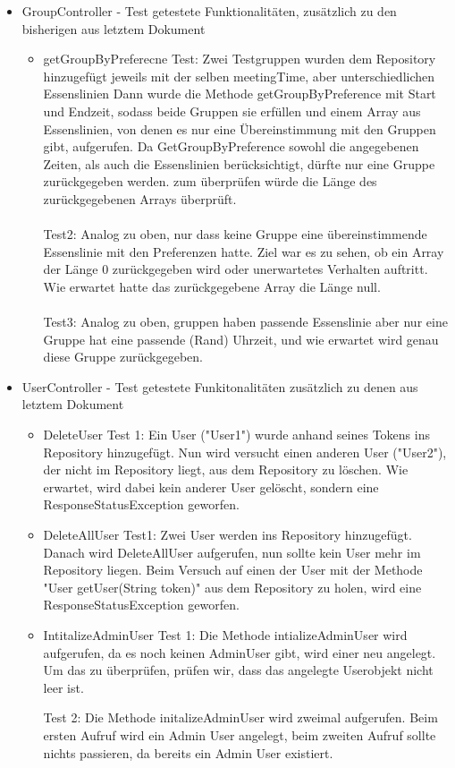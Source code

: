 \documentclass[a4paper]{scrreprt}
\begin{document}
\begin{itemize}

\item GroupController - Test
getestete Funktionalitäten, zusätzlich zu den bisherigen aus letztem Dokument
\begin{itemize}


\item getGroupByPreferecne
Test: Zwei Testgruppen wurden dem Repository hinzugefügt jeweils mit der selben meetingTime, aber unterschiedlichen Essenslinien
Dann wurde die Methode getGroupByPreference mit Start und Endzeit, sodass beide Gruppen sie erfüllen und einem Array aus Essenslinien, von denen es nur eine Übereinstimmung mit den Gruppen gibt, aufgerufen.
Da GetGroupByPreference sowohl die angegebenen Zeiten, als auch die Essenslinien berücksichtigt, dürfte nur eine Gruppe zurückgegeben werden.
zum überprüfen würde die Länge des zurückgegebenen Arrays überprüft.
\\ \\
Test2: Analog zu oben, nur dass keine Gruppe eine übereinstimmende Essenslinie mit den Preferenzen hatte.
Ziel war es zu sehen, ob ein Array der Länge 0 zurückgegeben wird oder unerwartetes Verhalten auftritt.
Wie erwartet hatte das zurückgegebene Array die Länge null.
\\ \\
Test3: Analog zu oben, gruppen haben passende Essenslinie aber nur eine Gruppe hat eine passende (Rand) Uhrzeit, und wie erwartet wird genau diese Gruppe zurückgegeben.
\end{itemize}

\item UserController - Test 
getestete Funkitonalitäten zusätzlich zu denen aus letztem Dokument

\begin{itemize}

\item DeleteUser
Test 1: Ein User ("User1") wurde anhand seines Tokens ins Repository hinzugefügt. Nun wird versucht einen anderen User ("User2"), der nicht im Repository liegt, aus dem Repository zu löschen. Wie erwartet, wird dabei kein anderer User gelöscht, sondern eine ResponseStatusException geworfen.

\item DeleteAllUser
Test1: Zwei User werden ins Repository hinzugefügt. Danach wird DeleteAllUser aufgerufen, nun sollte kein User mehr im Repository liegen. Beim Versuch auf einen der User mit der Methode "User getUser(String token)" aus dem Repository zu holen, wird eine ResponseStatusException geworfen. 

\item IntitalizeAdminUser
Test 1: Die Methode intializeAdminUser wird aufgerufen, da es noch keinen AdminUser gibt, wird einer neu angelegt. Um das zu überprüfen, prüfen wir, dass das angelegte Userobjekt nicht leer ist.

Test 2: Die Methode initalizeAdminUser wird zweimal aufgerufen. Beim ersten Aufruf wird ein Admin User angelegt, beim zweiten Aufruf sollte nichts passieren, da bereits ein Admin User existiert. 
\end{itemize}
\end{itemize}
\end{document}
